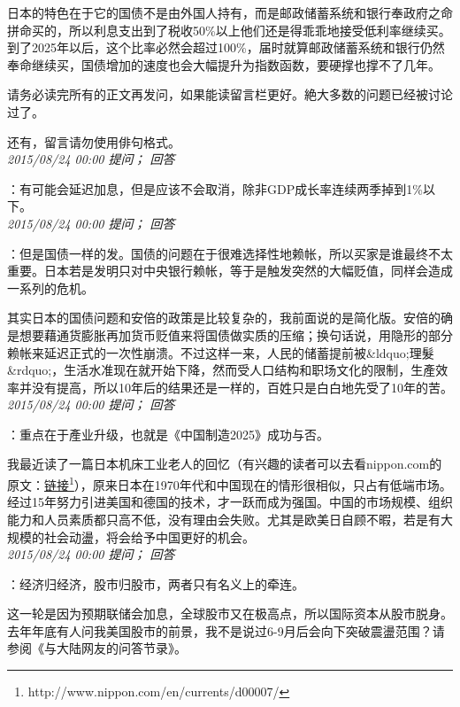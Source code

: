 \documentclass[twocolumn]{ctexart}
\begin{document}
日本的特色在于它的国债不是由外国人持有，而是邮政储蓄系统和银行奉政府之命拼命买的，所以利息支出到了税收50\%以上他们还是得乖乖地接受低利率继续买。到了2025年以后，这个比率必然会超过100\%，届时就算邮政储蓄系统和银行仍然奉命继续买，国债增加的速度也会大幅提升为指数函数，要硬撑也撑不了几年。

请务必读完所有的正文再发问，如果能读留言栏更好。絶大多数的问题已经被讨论过了。

还有，留言请勿使用俳句格式。\\

\textit{\hfill\noindent\small 2015/08/24 00:00 提问； 回答}

：有可能会延迟加息，但是应该不会取消，除非GDP成长率连续两季掉到1\%以下。\\

\textit{\hfill\noindent\small 2015/08/24 00:00 提问； 回答}

：但是国债一样的发。国债的问题在于很难选择性地赖帐，所以买家是谁最终不太重要。日本若是发明只对中央银行赖帐，等于是触发突然的大幅贬值，同样会造成一系列的危机。

其实日本的国债问题和安倍的政策是比较复杂的，我前面说的是简化版。安倍的确是想要藉通货膨胀再加货币贬值来将国债做实质的压缩；换句话说，用隐形的部分赖帐来延迟正式的一次性崩溃。不过这样一来，人民的储蓄提前被\&ldquo;理髮\&rdquo;，生活水准现在就开始下降，然而受人口结构和职场文化的限制，生產效率并没有提高，所以10年后的结果还是一样的，百姓只是白白地先受了10年的苦。\\

\textit{\hfill\noindent\small 2015/08/24 00:00 提问； 回答}

：重点在于產业升级，也就是《中国制造2025》成功与否。

我最近读了一篇日本机床工业老人的回忆（有兴趣的读者可以去看nippon.com的原文：\href{http://www.nippon.com/en/currents/d00007/}{链接\footnote{\url{http://www.nippon.com/en/currents/d00007/}}}），原来日本在1970年代和中国现在的情形很相似，只占有低端市场。经过15年努力引进美国和德国的技术，才一跃而成为强国。中国的市场规模、组织能力和人员素质都只高不低，没有理由会失败。尤其是欧美日自顾不暇，若是有大规模的社会动盪，将会给予中国更好的机会。\\

\textit{\hfill\noindent\small 2015/08/24 00:00 提问； 回答}

：经济归经济，股市归股市，两者只有名义上的牵连。

这一轮是因为预期联储会加息，全球股市又在极高点，所以国际资本从股市脱身。去年年底有人问我美国股市的前景，我不是说过6-9月后会向下突破震盪范围？请参阅《与大陆网友的问答节录》。
\end{document}
